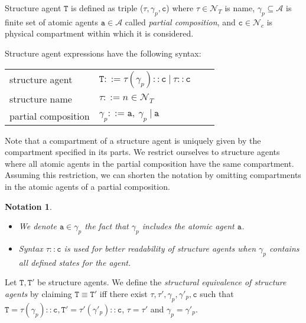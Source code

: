 \documentclass{entcs}
\renewcommand{\~}[0]{\texttildelow}
\newcommand{\choice}{|}
\newtheorem{notation}[thm]{Notation}
\begin{document}
\begin{definition}
Structure agent $\mathtt{T}$ is defined as triple ($\tau, \gamma_p, \mathtt{c}$) where $\tau \in \mathcal{N}_{T}$ is name, $\gamma_p \subseteq \mathcal{A}$ is finite set of atomic agents $\mathtt{a} \in \mathcal{A}$ called \emph{partial composition}, and $\mathtt{c} \in \mathcal{N}_{c}$ is physical compartment within which it is considered.
\end{definition}

Structure agent expressions have the following syntax:

\begin{center}
{\small
\hspace*{-1cm}\begin{tabular}{ ll ll }
 structure agent & $\mathtt{T} ::= \tau(\gamma_p)::\mathtt{c}~\choice~\tau::\mathtt{c}$\\
 structure name & $\tau ::= n \in \mathcal{N}_{T}$\\
 partial composition & $\gamma_p ::= \mathtt{a},~\gamma_p~\choice~\mathtt{a}$\\
\end{tabular}
}
\end{center}

Note that a compartment of a structure agent is uniquely given by the compartment specified in its parts. We restrict ourselves to structure agents where all atomic agents in the partial composition have the same compartment. Assuming this restriction, we can shorten the notation by omitting compartments in the atomic agents of a partial composition.    

\begin{notation}
~
\begin{itemize}
\item We denote $\mathtt{a}\in\gamma_p$ the fact that $\gamma_p$ includes the atomic agent $\mathtt{a}$.
\item Syntax $\tau::\mathtt{c}$ is used for better readability of structure agents when $\gamma_p$ contains all defined states for the agent.
\end{itemize}
\end{notation}

\begin{defn}
Let $\mathtt{T},\mathtt{T}'$ be structure agents. We define the \emph{structural equivalence of structure agents} by claiming $\mathtt{T}\equiv\mathtt{T}'$ iff there exist $\tau,\tau',\gamma_p,\gamma'_p,\mathtt{c}$ such that $\mathtt{T}=\tau(\gamma_p)::\mathtt{c},\mathtt{T}'=\tau'(\gamma'_p)::\mathtt{c}$, $\tau=\tau'$ and $\gamma_p=\gamma'_p$.
\end{defn}
\end{document}
